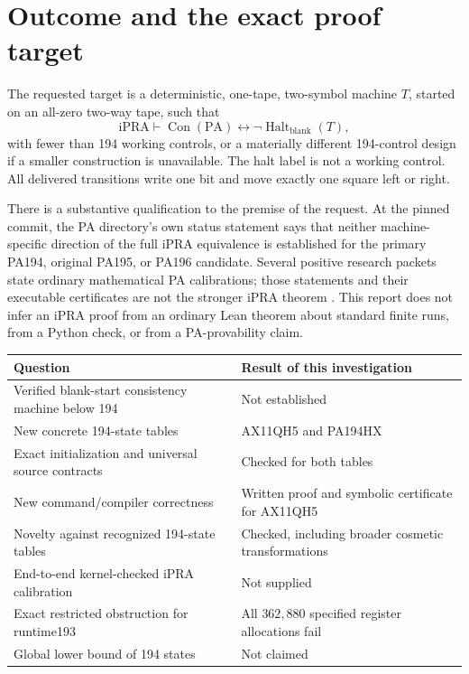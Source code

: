 \documentclass[11pt]{article}
\newcommand{\PA}{\mathrm{PA}}
\newcommand{\iPRA}{\mathrm{iPRA}}
\newcommand{\Con}{\operatorname{Con}}
\newcommand{\Halt}{\operatorname{Halt}}
\begin{document}
\begingroup\small
\setlength{\parskip}{0pt}
\tableofcontents
\endgroup
\clearpage

\section{Outcome and the exact proof target}

The requested target is a deterministic, one-tape, two-symbol machine $T$,
started on an all-zero two-way tape, such that
\[
 \iPRA\vdash \Con(\PA)\longleftrightarrow\neg\Halt_{
 \mathrm{blank}}(T),
\]
with fewer than 194 working controls, or a materially different 194-control
design if a smaller construction is unavailable. The halt label is not a
working control. All delivered transitions write one bit and move exactly
one square left or right.

There is a substantive qualification to the premise of the request. At the
pinned commit, the PA directory's own status statement says that neither
machine-specific direction of the full iPRA equivalence is established for
the primary PA194, original PA195, or PA196 candidate. Several positive
research packets state ordinary mathematical PA calibrations; those statements and their
executable certificates are not the stronger iPRA theorem
\cite{pa-status,incoming-status}. This report does not infer an iPRA proof
from an ordinary Lean theorem about standard finite runs, from a Python
check, or from a PA-provability claim.

\begin{center}
\begin{tabular}{@{}p{.57\linewidth}p{.35\linewidth}@{}}
\toprule
Question & Result of this investigation\\\midrule
Verified blank-start consistency machine below 194 & Not established\\
New concrete 194-state tables & AX11QH5 and PA194HX\\
Exact initialization and universal source contracts & Checked for both tables\\
New command/compiler correctness & Written proof and symbolic certificate for AX11QH5\\
Novelty against recognized 194-state tables & Checked, including broader cosmetic transformations\\
End-to-end kernel-checked iPRA calibration & Not supplied\\
Exact restricted obstruction for runtime193 & All $362{,}880$ specified register allocations fail\\
Global lower bound of 194 states & Not claimed\\
\bottomrule
\end{tabular}
\end{center}
\end{document}
